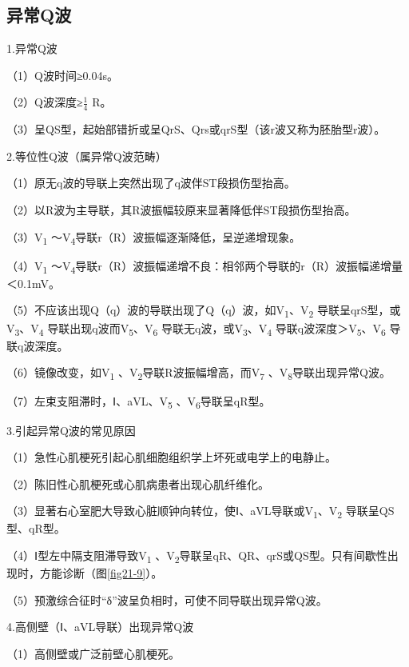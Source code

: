 \protect\hypertarget{text00009.htmlux5cux23subid45}{}{}

\subsection{异常Q波}

1.异常Q波

（1）Q波时间≥0.04s。

（2）Q波深度≥$\frac{1}{4}$ R。

（3）呈QS型，起始部错折或呈QrS、Qrs或qrS型（该r波又称为胚胎型r波）。

2.等位性Q波（属异常Q波范畴）

（1）原无q波的导联上突然出现了q波伴ST段损伤型抬高。

（2）以R波为主导联，其R波振幅较原来显著降低伴ST段损伤型抬高。

（3）V\textsubscript{1} ～V\textsubscript{4}导联r（R）波振幅逐渐降低，呈逆递增现象。

（4）V\textsubscript{1} ～V\textsubscript{4}导联r（R）波振幅递增不良：相邻两个导联的r（R）波振幅递增量＜0.1mV。

（5）不应该出现Q（q）波的导联出现了Q（q）波，如V\textsubscript{1}、V\textsubscript{2} 导联呈qrS型，或V\textsubscript{3}、V\textsubscript{4} 导联出现q波而V\textsubscript{5}、V\textsubscript{6} 导联无q波，或V\textsubscript{3}、V\textsubscript{4} 导联q波深度＞V\textsubscript{5}、V\textsubscript{6} 导联q波深度。

（6）镜像改变，如V\textsubscript{1} 、V\textsubscript{2}导联R波振幅增高，而V\textsubscript{7} 、V\textsubscript{8}导联出现异常Q波。

（7）左束支阻滞时，Ⅰ、aVL、V\textsubscript{5} 、V\textsubscript{6}导联呈qR型。

3.引起异常Q波的常见原因

（1）急性心肌梗死引起心肌细胞组织学上坏死或电学上的电静止。

（2）陈旧性心肌梗死或心肌病患者出现心肌纤维化。

（3）显著右心室肥大导致心脏顺钟向转位，使Ⅰ、aVL导联或V\textsubscript{1}、V\textsubscript{2} 导联呈QS型、qR型。

（4）Ⅰ型左中隔支阻滞导致V\textsubscript{1} 、V\textsubscript{2}导联呈qR、QR、qrS或QS型。只有间歇性出现时，方能诊断（图\ref{fig21-9}）。

（5）预激综合征时“δ”波呈负相时，可使不同导联出现异常Q波。

4.高侧壁（Ⅰ、aVL导联）出现异常Q波

（1）高侧壁或广泛前壁心肌梗死。

